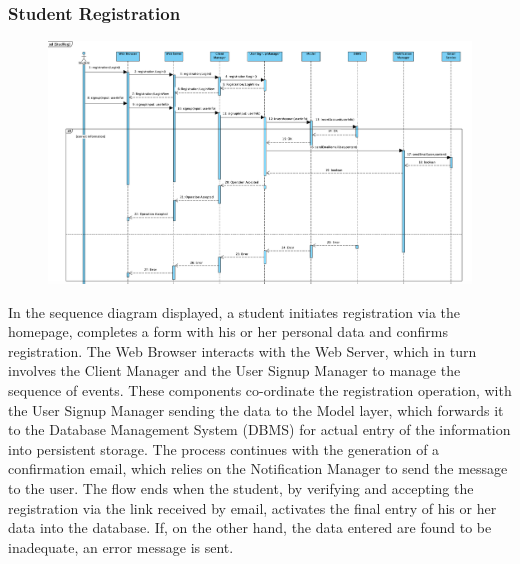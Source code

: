 \subsubsection{Student Registration}
\begin{figure}[H]
    \centering
    \includegraphics[width=1\textwidth]{SequenceDiagram/StudReg.png}
    \label{fig:enter-label}
\end{figure}
In the sequence diagram displayed, a student initiates registration via the homepage, completes a form with his or her personal data and confirms registration. The Web Browser interacts with the Web Server, which in turn involves the Client Manager and the User Signup Manager to manage the sequence of events.
These components co-ordinate the registration operation, with the User Signup Manager sending the data to the Model layer, which forwards it to the Database Management System (DBMS) for actual entry of the information into persistent storage. The process continues with the generation of a confirmation email, which relies on the Notification Manager to send the message to the user. The flow ends when the student, by verifying and accepting the registration via the link received by email, activates the final entry of his or her data into the database. If, on the other hand, the data entered are found to be inadequate, an error message is sent.
